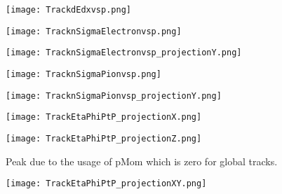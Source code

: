 \documentclass{beamer}
\begin{document}
\begin{frame}
  \begin{figure}[h!]
  \centering
  \texttt{[image: TrackdEdxvsp.png]}
  \end{figure}
\end{frame}

\begin{frame}
  \begin{figure}[h!]
  \centering
  \texttt{[image: TracknSigmaElectronvsp.png]}
  \end{figure}
\end{frame}

\begin{frame}
  \begin{figure}[h!]
  \centering
  \texttt{[image: TracknSigmaElectronvsp\_projectionY.png]}
  \end{figure}
\end{frame}

\begin{frame}
  \begin{figure}[h!]
  \centering
  \texttt{[image: TracknSigmaPionvsp.png]}
  \end{figure}
\end{frame}

\begin{frame}
  \begin{figure}[h!]
  \centering
  \texttt{[image: TracknSigmaPionvsp\_projectionY.png]}
  \end{figure}
\end{frame}

\begin{frame}
  \begin{figure}[h!]
  \centering
  \texttt{[image: TrackEtaPhiPtP\_projectionX.png]}
  \end{figure}
\end{frame}

\begin{frame}
  \begin{figure}[h!]
  \centering
  \texttt{[image: TrackEtaPhiPtP\_projectionZ.png]}
  \caption{Peak due to the usage of pMom which is zero for global tracks.}
  \end{figure}
\end{frame}

\begin{frame}
  \begin{figure}[h!]
  \centering
  \texttt{[image: TrackEtaPhiPtP\_projectionXY.png]}
  \end{figure}
\end{frame}
\end{document}
